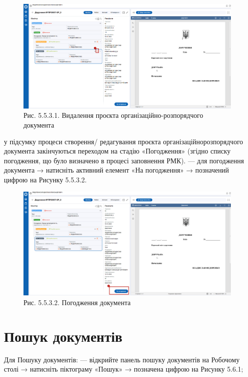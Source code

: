\begin{figure}[!htbp]
\centerline{\includegraphics[width=\textwidth]{img/5.5.3.1.png}}
\caption{Рис. 5.5.3.1. Видалення проєкта організаційно-розпорядчого документа}
\end{figure}

у підсумку процеси створення/ редагування проєкта організаційнорозпорядчого документа
закінчуються переходом на стадію «Погодження» (згідно списку погодження, що було
визначено в процесі заповнення РМК).
--- для погодження документа → натисніть активний елемент «На погодження» → позначений
цифрою  на Рисунку 5.5.3.2.

\begin{figure}[!htbp]
\centerline{\includegraphics[width=\textwidth]{img/5.5.3.2.png}}
\caption{Рис. 5.5.3.2. Погодження документа}
\end{figure}

\section{Пошук документів}

Для Пошуку документів:
--- відкрийте панель пошуку документів на Робочому столі → натисніть
піктограму «Пошук» → позначена цифрою  на Рисунку 5.6.1;

